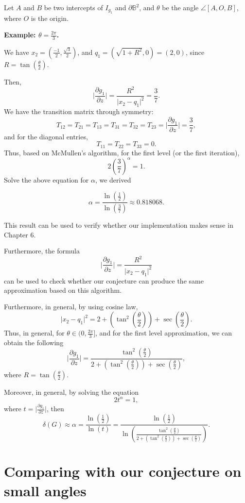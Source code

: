 \documentclass[12pt,oneside]{sfsuthesis}
\theoremstyle{plain} %
\theoremstyle{definition}  %
\theoremstyle{remark}  %
\theoremstyle{plain}
\begin{document}
{Let $A$ and $B$ be two intercepts of $I_{g_1}$ and $\partial \mathbb{B}^2$, and $\theta$ be the angle $\angle [A,O,B]$, where $O$ is the origin. 

\noindent \textbf{Example: $\theta=\frac{2\pi}{3}$.} 


We have $x_2=\left(\frac{-1}{2},\frac{\sqrt{3}}{2} \right)$, and $q_1=\left(\sqrt{1+R^2},0 \right)=(2,0)$, since $R=\tan\left( \frac{\theta}{2}\right)$.

Then,
$$
\bigg|\frac{\partial g_1}{\partial z}\bigg|=\frac{R^2}{\vert x_2-q_1\vert^2}=\frac{3}{7}.
$$
We have the transition matrix through symmetry:
$$T_{12}=T_{21}=T_{13}=T_{31}=T_{32}=T_{23}=\bigg|\frac{\partial g_1}{\partial z}\bigg|=\frac{3}{7},$$
and for the diagonal entries,
$$
T_{11}=T_{22}=T_{33}=0.
$$
Thus, based on McMullen's algorithm, for the first level (or the first iteration),
$$
2\left(\frac{3}{7}\right)^\alpha=1.
$$
Solve the above equation for $\alpha$, we derived

$$
\alpha=\frac{\ln\left(\frac{1}{2}\right)}{\ln\left(\frac{3}{7}\right)}\approx 0.818068.
$$

This result can be used to verify whether our implementation makes sense in Chapter 6.

Furthermore, the formula
$$
\bigg|\frac{\partial g_1}{\partial z}\bigg|=\frac{R^2}{\vert x_2-q_1\vert^2}
$$
can be used to check whether our conjecture can produce the same approximation based on this algorithm.

Furthermore, in general, by using cosine law, 
$$
\vert x_2-q_1\vert^2=2+\left(\tan^2\left(\frac{\theta}{2}\right)\right)+\sec\left(\frac{\theta}{2}\right).
$$
Thus, in general, for $\theta\in(0,\frac{2\pi}{3}]$, and for the first level approximation, we can obtain the following
$$
\bigg|\frac{\partial g_1}{\partial z}\bigg|=\frac{\tan^2\left(\frac{\theta}{2}\right)}{2+\left(\tan^2\left(\frac{\theta}{2}\right)\right)+\sec\left(\frac{\theta}{2}\right)},
$$
where $R=\tan\left(\frac{\theta}{2}\right)$.


Moreover, in general, by solving the equation
$$
2t^\alpha=1,
$$
where $t=\bigg|\frac{\partial g_1}{\partial z}\bigg|$, then 
$$
\delta(G)\approx \alpha=\frac{\ln\left(\frac{1}{2}\right)}{\ln\left(t \right)}
=\frac{\ln\left(\frac{1}{2}\right)}{\ln\left(\frac{\tan^2\left(\frac{\theta}{2}\right)}{2+\left(\tan^2\left(\frac{\theta}{2}\right)\right)+\sec\left(\frac{\theta}{2}\right)} \right)}.
$$



\section{Comparing with our conjecture on small angles}

}
\end{document}
